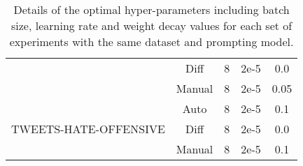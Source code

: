 \begin{table*}[!ht]
{\begin{tabular}{c | c | c c c}
        & Diff
        &  8
        & 2e-5
        & 0.0 \\

        & Manual
        &  8
        & 2e-5
        & 0.05 \\

        \midrule
        \multirow{3}{*}{TWEETS-HATE-OFFENSIVE } 
        & Auto
        &  8 
        & 2e-5
        & 0.1 \\

        & Diff
        &  8
        & 2e-5
        & 0.0 \\

        & Manual
        &  8
        & 2e-5
        & 0.1 \\

        \bottomrule
        \end{tabular}
 }
 \caption{Details of the optimal hyper-parameters including batch size, learning rate and weight decay values for each set of experiments with the same dataset and prompting model.}
 \label{tab:hyper_param}
\end{table*}